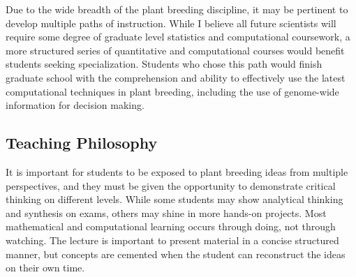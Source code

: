 \documentclass[11pt]{article}
\begin{document}
Due to the wide breadth of the plant breeding discipline, it may be pertinent to develop multiple paths of instruction. While I believe all future scientists will require some degree of graduate level statistics and computational coursework, a more structured series of quantitative and computational courses would benefit students seeking specialization. Students who chose this path would finish graduate school with the comprehension and ability to effectively use the latest computational techniques in plant breeding, including the use of genome-wide information for decision making.






\subsection*{Teaching Philosophy}

It is important for students to be exposed to plant breeding ideas from multiple perspectives, and they must be given the opportunity to demonstrate critical thinking on different levels. While some students may show analytical thinking and synthesis on exams, others may shine in more hands-on projects. Most mathematical and computational learning occurs through doing, not through watching. The lecture is important to present material in a concise structured manner, but concepts are cemented when the student can reconstruct the ideas on their own time.

\end{document}
